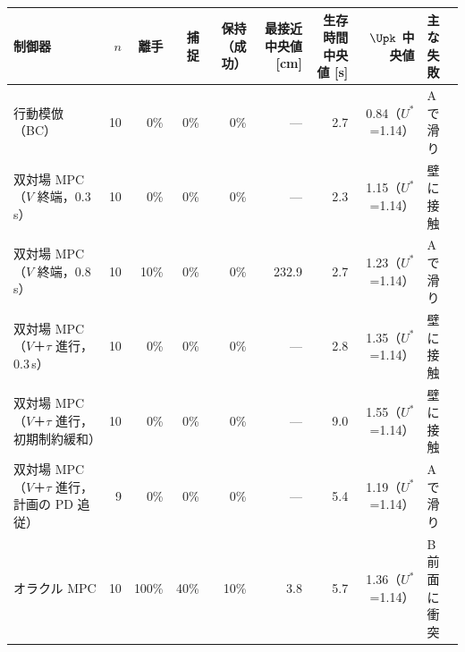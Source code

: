 \begin{tabular}{lrrrrrrrl}
\toprule
制御器 & $n$ & 離手 & 捕捉 & 保持（成功） & 最接近中央値 [cm] & 生存時間中央値 [s] & $\Upk$ 中央値 & 主な失敗 \\
\midrule
行動模倣（BC） & 10 & 0\% & 0\% & 0\% & --- & 2.7 & 0.84（$U^*$=1.14） & A で滑り \\
双対場 MPC（$V$ 終端，0.3\,s） & 10 & 0\% & 0\% & 0\% & --- & 2.3 & 1.15（$U^*$=1.14） & 壁に接触 \\
双対場 MPC（$V$ 終端，0.8\,s） & 10 & 10\% & 0\% & 0\% & 232.9 & 2.7 & 1.23（$U^*$=1.14） & A で滑り \\
双対場 MPC（$V$＋$\tau$ 進行，0.3\,s） & 10 & 0\% & 0\% & 0\% & --- & 2.8 & 1.35（$U^*$=1.14） & 壁に接触 \\
双対場 MPC（$V$＋$\tau$ 進行，初期制約緩和） & 10 & 0\% & 0\% & 0\% & --- & 9.0 & 1.55（$U^*$=1.14） & 壁に接触 \\
双対場 MPC（$V$＋$\tau$ 進行，計画の PD 追従） & 9 & 0\% & 0\% & 0\% & --- & 5.4 & 1.19（$U^*$=1.14） & A で滑り \\
オラクル MPC & 10 & 100\% & 40\% & 10\% & 3.8 & 5.7 & 1.36（$U^*$=1.14） & B 前面に衝突 \\
\bottomrule
\end{tabular}
